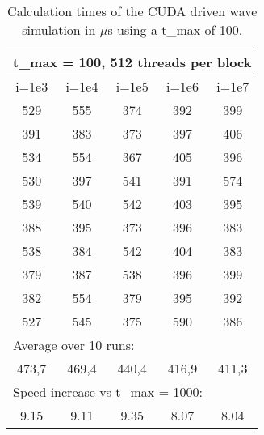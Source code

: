 \documentclass[a4paper]{article}
\begin{document}
		\begin{table}[H]
			\caption{Calculation times of the CUDA driven wave simulation in $\mu$s using a t\_max of 100.}
			\label{table:iChange100}
			\begin{center}
				\begin{tabular}{| c | c | c | c | c |}
					\hline
					\multicolumn{5}{|l|}{t\_max = 100, 512 threads per block}\\
					\hline
					i=1e3 & i=1e4 & i=1e5 & i=1e6 & i=1e7\\ 
					\hline
					529 & 555 & 374 & 392 & 399\\ 
					\hline
					391 & 383 & 373 & 397 & 406\\ 
					\hline
					534 & 554 & 367 & 405 & 396\\ 
					\hline
					530 & 397 & 541 & 391 & 574\\ 
					\hline
					539 & 540 & 542 & 403 & 395\\ 
					\hline
					388 & 395 & 373 & 396 & 383\\ 
					\hline
					538 & 384 & 542 & 404 & 383\\ 
					\hline
					379 & 387 & 538 & 396 & 399\\ 
					\hline
					382 & 554 & 379 & 395 & 392\\ 
					\hline
					527 & 545 & 375 & 590 & 386\\ 
					\hline
					\multicolumn{5}{|l|}{Average over 10 runs:}\\
					\hline
					473,7 & 469,4 & 440,4 & 416,9 & 411,3\\ 
					\hline
					\multicolumn{5}{|l|}{Speed increase vs t\_max = 1000:}\\
					\hline
					9.15 & 9.11 & 9.35 & 8.07 & 8.04\\
					\hline
				\end{tabular}
			\end{center}
		\end{table}
		
\end{document}
